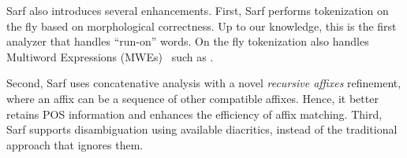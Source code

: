 \documentclass[11pt]{article}
\newcommand{\noVocRL}[1]{\transtrue\novocalize\RL{#1}\vocalize}
\begin{document}
Sarf %
also  
introduces 
several enhancements. %
First,
Sarf %
performs tokenization on the fly based on morphological correctness.
Up to our knowledge, this is the first %
analyzer that 
handles %
``run-on'' words. 
%
On the fly tokenization also handles
Multiword Expressions (MWEs)~\cite{MWE} such as \noVocRL{`bid alkarym}.

Second, 
Sarf uses concatenative analysis with a novel %
{\em recursive affixes} refinement,
where an affix can be a sequence of other compatible affixes.
Hence, it better retains
POS information  
and enhances the 
efficiency of affix matching. 
Third, Sarf supports disambiguation using 
available diacritics, instead of the traditional approach that ignores them.
\end{document}
